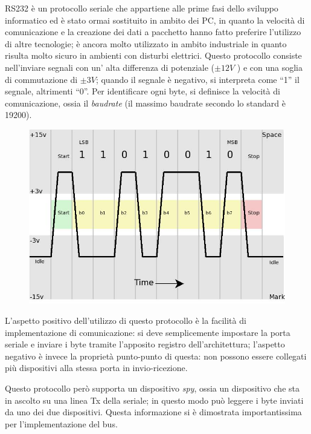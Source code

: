 \documentclass[a4paper,titlepage]{book}
\begin{document}
RS232 è un protocollo seriale che appartiene alle prime fasi dello sviluppo informatico ed è stato ormai sostituito in ambito dei PC, in quanto la velocità di comunicazione e la creazione dei dati a pacchetto hanno fatto preferire l'utilizzo di altre tecnologie; è ancora molto utilizzato in ambito industriale in quanto risulta molto sicuro in ambienti con disturbi elettrici. Questo protocollo consiste nell'inviare segnali con un' alta differenza di potenziale ($ \pm12V $ ) e con una soglia di commutazione di $\pm 3V $; quando il segnale è negativo, si interpreta come ``1'' il segnale, altrimenti ``0''. Per identificare ogni byte, si definisce la velocità di comunicazione, ossia il \textit{baudrate} (il massimo baudrate secondo lo standard è 19200).

\begin{figure}[!ht]
\centering
\includegraphics[scale=0.35]{rs232.jpg}
\end{figure}

L'aspetto positivo dell'utilizzo di questo protocollo è la facilità di implementazione di comunicazione: si deve semplicemente impostare la porta seriale e inviare i byte tramite l'apposito registro dell'architettura; l'aspetto negativo è invece la proprietà punto-punto di questa: non possono essere collegati più dispositivi alla stessa porta in invio-ricezione.

Questo protocollo però supporta un dispositivo \textit{spy}, ossia un dispositivo che sta in ascolto su una linea Tx della seriale; in questo modo può leggere i byte inviati da uno dei due dispositivi. Questa informazione si è dimostrata importantissima per l'implementazione del bus.

~
\end{document}
